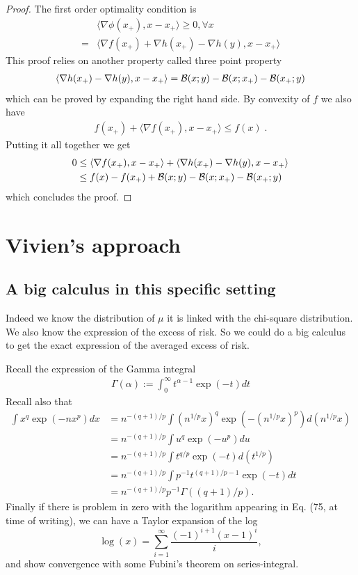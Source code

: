 \documentclass{article}
\begin{document}
\begin{proof}
	The first order optimality condition is
	\begin{align}
		&\langle \nabla \phi (x_+) , x -  x_+ \rangle \geq 0, \forall x \\
		=& \langle \nabla f(x_+) + \nabla h(x_+) - \nabla h (y), x - x_+ \rangle  
	\end{align}
	This proof relies on another property called three point property 
	\begin{align}
		\langle \nabla h(x_+) - \nabla h (y), x - x_+ \rangle  ={\mathcal B}(x;y) -{\mathcal B}(x;x_+) - {\mathcal B}(x_+;y) 
	\end{align}
	which can be proved by expanding the right hand side.
	By convexity of $f$ we also have 
	\begin{align}
		 f(x_+) + \langle \nabla f(x_+), x - x_+ \rangle \leq f(x) \; .
	\end{align} 
	Putting it all together we get
	\begin{align}
		0 
		&\leq  \langle \nabla f(x_+), x - x_+ \rangle + \langle \nabla h(x_+) - \nabla h (y), x - x_+ \rangle  \\
		&\leq f(x) - f(x_+) + {\mathcal B}(x;y) -{\mathcal B}(x;x_+) - {\mathcal B}(x_+;y)
	\end{align}
	which concludes the proof.
\end{proof}

\section{Vivien's approach}
\subsection{A big calculus in this specific setting}

Indeed we know the distribution of $\mu$ it is linked with the chi-square distribution. We also know the expression of the excess of risk. So we could do a big calculus to get the exact expression of the averaged excess of risk.

Recall the expression of the Gamma integral
\begin{align}
  \Gamma(\alpha):=\int_0^\infty t^{\alpha-1} \exp(-t) d t
\end{align}
Recall also that
\begin{align}
    \int x^q \exp(-nx^p) dx
    &= n^{-(q+1)/p} \int (n^{1/p}x)^q \exp(-(n^{1/p}x)^p) d(n^{1/p}x)\\
    &= n^{-(q+1)/p} \int u^q \exp(-u^p) du\\
    &= n^{-(q+1)/p} \int t^{q/p} \exp(-t) d(t^{1/p})\\
    &= n^{-(q+1)/p} \int p^{-1} t^{(q+1)/p - 1} \exp(-t) dt\\
    &= n^{-(q+1)/p} p^{-1} \Gamma((q+1)/p).
\end{align}
Finally if there is problem in zero with the logarithm appearing in Eq. (75, at time of writing), we can have a Taylor expansion of the log 
\[
  \log(x) = \sum_{i=1}^\infty \frac{(-1)^{i+1}(x-1)^i}{i},
\]
and show convergence with some Fubini's theorem on series-integral.
\end{document}
